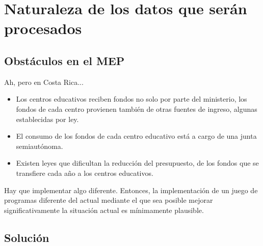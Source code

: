 \documentclass[xcolor=table, aspectratio=169]{beamer}
\begin{document}
\section{Naturaleza de los datos que ser\'an procesados}

\subsection{Obst\'aculos en el MEP}

\begin{frame}[t]{Ah, pero en Costa Rica...}
	\begin{itemize}
		\item Los centros educativos reciben fondos no solo por parte del ministerio, los fondos de cada centro provienen tambi\'en de otras fuentes de ingreso, algunas establecidas por ley.
		\item El consumo de los fondos de cada centro educativo est\'a a cargo de una junta semiaut\'onoma.
		\item Existen leyes que dificultan la reducci\'on del presupuesto, de los fondos que se transfiere cada a\~no a los centros educativos.
	\end{itemize}
		
	\begin{block}{Hay que implementar algo diferente.}
		Entonces, la implementaci\'on de un juego de programas diferente del actual mediante el que sea posible mejorar significativamente la situaci\'on actual es m\'inimamente plausible.
	\end{block}
\end{frame}

\subsection{Soluci\'on}
\end{document}
